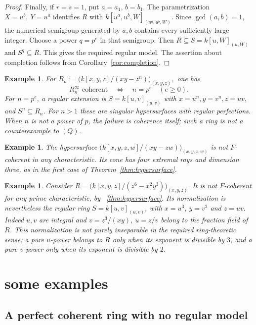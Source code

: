 \documentclass[11pt,a4paper]{amsart}
\numberwithin{equation}{section}
\newtheorem{example}[theorem]{Example}\newtheorem{notation}[theorem]{Notation}
\begin{document}
\begin{proof}
Finally, if $r=s=1$, put $a=a_1$, $b=b_1$.
The parametrization $X=u^b,\ Y=u^a$ identifies $R$ with
$k[u^a,u^b,W]_{(u^a,u^b,W)}.$
 Since $\gcd(a,b)=1$, the numerical semigroup generated by $a,b$
contains every sufficiently large integer. Choose a power	$q=p^e$ in that semigroup. Then	$ R\subseteq S=k[u,W]_{(u,W)}$ and $S^q\subseteq R. $ 
This gives the required regular model.
The assertion about completion follows from
Corollary~\ref{cor:completion}.
 \end{proof}
 
 \begin{example}\label{ex:An}
 	For $	R_n:=\bigl(k[x,y,z]/(xy-z^n)\bigr)_{(x,y,z)},$	one has
 $$	R_n^\infty\text{ coherent}
 \quad\Longleftrightarrow\quad n=p^e\quad(e\geq0).	$$	For $n=p^e$, a regular extension is
 $	S=k[u,v]_{(u,v)}	$ with	$x=u^n, y=v^n,z=uv,	$	and $S^n\subseteq R_n$.
 For $n>1$ these are singular hypersurfaces with regular perfections.	When $n$ is not a power of $p$, the failure is coherence itself;
 such a ring is not a counterexample to $(Q)$.
 \end{example}
 
 \begin{example}
The hypersurface
$	\bigl(k[x,y,z,w]/(xy-zw)\bigr)_{(x,y,z,w)} $
 is not $F$-coherent in any characteristic. Its cone has four
 extremal rays and dimension three, as in the first case of
Theorem~\ref{thm:hypersurface}.
 \end{example}
 
 \begin{example}\label{ex:normalization}
 Consider
 $	R=\bigl(k[x,y,z]/(z^6-x^2y^3)\bigr)_{(x,y,z)}.$	It is not $F$-coherent for any prime characteristic, by ~\ref{thm:hypersurface}.
 Its normalization is nevertheless the regular ring
 $S=k[u,v]_{(u,v)}$, with
 $x=u^3$, $y=v^2$ and $z=uv. $ 	Indeed $u,v$ are integral and	$v=z^3/(xy)$, $u=z/v$ belong to the fraction field of $R$.
 This normalization is not purely inseparable in the required
 ring-theoretic sense: a pure $u$-power belongs to $R$ only when
 its exponent is divisible by $3$, and a pure $v$-power only
 when its exponent is divisible by $2$.
 \end{example}
 
 \section{some examples}
 
 
  \subsection {A perfect coherent ring with no regular model}
 
\end{document}

